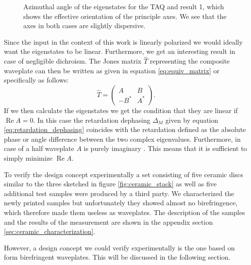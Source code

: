\begin{figure}[H]
    \centering
    
    \caption{Azimuthal angle of the eigenstates for the TAQ and result 1, which shows the effective orientation of the principle axes. We see that the axes in both cases are slightly dispersive.}
    \label{fig:cl4_eigenstate_azimuths}
\end{figure}

Since the input in the context of this work is linearly polarized we would ideally want the eigenstates to be linear. Furthermore, we get an interesting result in case of negligible dichroism. The Jones matrix $\hat{T}$ representing the composite waveplate can then be written as given in equation \ref{eq:equiv_matrix} or specifically as follows:
\begin{equation}
    \hat{T} = 
    \begin{pmatrix} 
    A & B \\
    -B^* & A^*
    \end{pmatrix}.
\end{equation}
If we then calculate the eigenstates we get the condition that they are linear if $\operatorname{Re}A=0$. In this case the retardation dephasing $\Delta_M$ given by equation \ref{eq:retardation_dephasing} coincides with the retardation defined as the absolute phase or angle difference between the two complex eigenvalues. Furthermore, in case of a half waveplate $A$ is purely imaginary \cite{McIntyre1968}. This means that it is sufficient to simply minimize $\operatorname{Re}A$.

To verify the design concept experimentally a set consisting of five ceramic discs similar to the three sketched in figure \ref{fig:ceramic_stack} as well as five additional test samples were produced by a third party. We characterized the newly printed samples but unfortunately they showed almost no birefringence, which therefore made them useless as waveplates. The description of the samples and the results of the measurement are shown in the appendix section \ref{sec:ceramic_characterization}. 

However, a design concept we could verify experimentally is the one based on form birefringent waveplates. This will be discussed in the following section.


